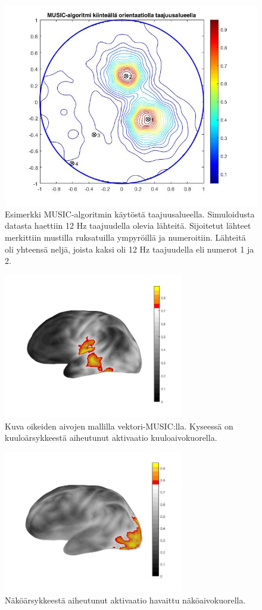 \begin{figure}
    \centering
    \includegraphics[width=\textwidth]{fMUSIC.jpg}
    \caption{Esimerkki MUSIC-algoritmin käytöstä taajuusalueella. Simuloidusta datasta haettiin 12 Hz taajuudella olevia lähteitä. Sijoitetut lähteet merkittiin mustilla ruksatuilla ympyröillä ja numeroitiin. Lähteitä oli yhteensä neljä, joista kaksi oli 12 Hz taajuudella eli numerot 1 ja 2.}
    \label{fig:fMUSIC}
\end{figure}

\clearpage
\begin{figure}
    \centering
    \includegraphics[width=0.7\textwidth]{kuulo.jpg}
    \caption{Kuva oikeiden aivojen mallilla vektori-MUSIC:lla. Kyseessä on kuuloärsykkeestä aiheutunut aktivaatio kuuloaivokuorella.}
\end{figure}

\begin{figure}
    \centering
    \includegraphics[width=0.7\textwidth]{esim1.jpg}
    \caption{Näköärsykkeestä aiheutunut aktivaatio havaittu näköaivokuorella.}
\end{figure}